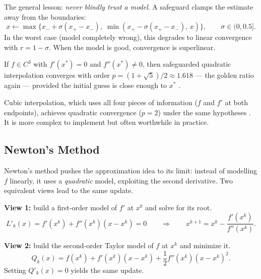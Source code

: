 The general lesson: \emph{never blindly trust a model}.
A safeguard clamps the estimate away from the boundaries:
\begin{equation}\label{eq:safeguard-clamping}
	x \gets \max\bigl\{x_- + \sigma(x_+ - x_-),\; \min(x_+ - \sigma(x_+ - x_-),\, x)\bigr\},
	\qquad \sigma \in (0, 0.5].
\end{equation}
In the worst case (model completely wrong), this degrades to linear convergence with $r = 1 - \sigma$.
When the model is good, convergence is superlinear.

\begin{thm}\label{thm:secant-conv}
	If $f \in C^3$ with $f'(x^*) = 0$ and $f''(x^*) \neq 0$, then safeguarded quadratic interpolation converges with order $p = (1 + \sqrt{5})/2 \approx 1.618$ --- the golden ratio again --- provided the initial guess is close enough to $x^*$ \cite{sun2006}.
\end{thm}

Cubic interpolation, which uses all four pieces of information ($f$ and $f'$ at both endpoints), achieves quadratic convergence ($p = 2$) under the same hypotheses \cite{sun2006,nocedal2006}.
It is more complex to implement but often worthwhile in practice.


\subsection{Newton's Method}\label{ssec:newton-univariate}

Newton's method pushes the approximation idea to its limit: instead of modelling $f$ linearly, it uses a \emph{quadratic} model, exploiting the second derivative.
Two equivalent views lead to the same update.

\textbf{View 1:} build a first-order model of $f'$ at $x^k$ and solve for its root.
\begin{equation}\label{eq:newton-view1}
	L'_k(x) = f'(x^k) + f''(x^k)(x - x^k) = 0
	\qquad \Longrightarrow \qquad
	x^{k+1} = x^k - \frac{f'(x^k)}{f''(x^k)}.
\end{equation}

\textbf{View 2:} build the second-order Taylor model of $f$ at $x^k$ and minimize it.
\begin{equation}\label{eq:newton-taylor-model}
	Q_k(x) = f(x^k) + f'(x^k)(x - x^k) + \frac{1}{2} f''(x^k)(x - x^k)^2.
\end{equation}
Setting $Q'_k(x) = 0$ yields the same update.

